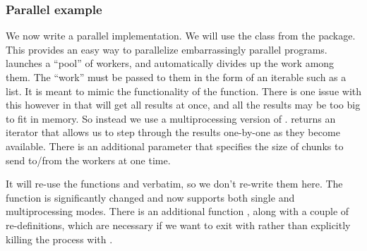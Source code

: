 \subsubsection{Parallel example}

We now write a parallel implementation.  We will use the  class from the  package.  This provides an easy way to parallelize embarrassingly parallel programs.   launches a ``pool'' of workers, and automatically divides up the work among them.  The ``work'' must be passed to them in the form of an iterable such as a list.  It is meant to mimic the functionality of the  function.  There is one issue with this however in that  will get all results at once, and all the results may be too big to fit in memory.  So instead we use a multiprocessing version of .   returns an iterator that allows us to step through the results one-by-one as they become available.  There is an additional parameter  that specifies the size of chunks to send to/from the workers at one time.  

It will re-use the functions  and  verbatim, so we don't re-write them here.  The  function is significantly changed and now supports both single and multiprocessing modes.  There is an additional function , along with a couple of re-definitions, which are necessary if we want to exit with  rather than explicitly killing the process with .

